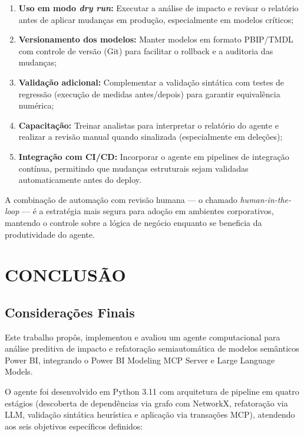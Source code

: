 \documentclass[
    12pt,               %
    openright,          %
    oneside,            %
    a4paper,            %
    chapter=TITLE,      %
    section=TITLE,      %
    brazil              %
]{abntex2}
\begin{document}
\begin{enumerate}
    \item \textbf{Uso em modo \textit{dry run}:} Executar a análise de impacto e revisar o relatório antes de aplicar mudanças em produção, especialmente em modelos críticos;
    \item \textbf{Versionamento dos modelos:} Manter modelos em formato PBIP/TMDL com controle de versão (Git) para facilitar o rollback e a auditoria das mudanças;
    \item \textbf{Validação adicional:} Complementar a validação sintática com testes de regressão (execução de medidas antes/depois) para garantir equivalência numérica;
    \item \textbf{Capacitação:} Treinar analistas para interpretar o relatório do agente e realizar a revisão manual quando sinalizada (especialmente em deleções);
    \item \textbf{Integração com CI/CD:} Incorporar o agente em pipelines de integração contínua, permitindo que mudanças estruturais sejam validadas automaticamente antes do deploy.
\end{enumerate}

A combinação de automação com revisão humana — o chamado \textit{human-in-the-loop} — é a estratégia mais segura para adoção em ambientes corporativos, mantendo o controle sobre a lógica de negócio enquanto se beneficia da produtividade do agente.

\chapter{CONCLUSÃO}

\section{Considerações Finais}

Este trabalho propôs, implementou e avaliou um agente computacional para análise preditiva de impacto e refatoração semiautomática de modelos semânticos Power BI, integrando o Power BI Modeling MCP Server e Large Language Models.

O agente foi desenvolvido em Python 3.11 com arquitetura de pipeline em quatro estágios (descoberta de dependências via grafo com NetworkX, refatoração via LLM, validação sintática heurística e aplicação via transações MCP), atendendo aos seis objetivos específicos definidos:
\end{document}
